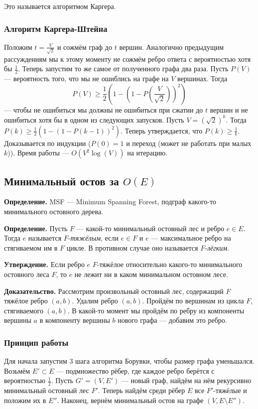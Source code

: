Это называется алгоритмом Каргера.

\subsubsection{Алгоритм Каргера-Штейна}
Положим $t = \frac{V}{\sqrt 2}$ и сожмём граф до $t$ вершин.
Аналогично предыдущим рассуждениям мы к этому моменту не сожмём ребро ответа с вероятностью хотя бы $\frac{1}{2}$.
Теперь запустим то же самое от полученного графа два раза.
Пусть $P(V)$ --- вероятность того, что мы не ошиблись на графе на $V$ вершинах.
Тогда
\[
    P(V) \ge \frac{1}{2} \left(1 - \left(1 - P \left( \frac{V}{\sqrt 2} \right) \right)^2 \right)
\]
--- чтобы не ошибиться мы должны не ошибиться при сжатии до $t$ вершин и не ошибиться хотя бы в одном из следующих запусков.
Пусть $V = (\sqrt 2)^k$.
Тогда $P(k) \ge \frac{1}{2} (1 - (1 - P(k - 1))^2)$.
Теперь утверждается, что $P(k) \ge \frac{1}{k}$.
Доказывается по индукции ($P(0) = 1$ и переход (может не работать при малых $k$)).
Время работы --- $O(V^2 \log(V))$ на итерацию.

\subsection{Минимальный остов за $O(E)$}
\textbf{Определение.} MSF --- Minimum Spanning Forest, подграф какого-то минимального остовного дерева.

\textbf{Определение.} Пусть $F$ --- какой-то минимальный остовный лес и ребро $e \in E$.
Тогда $e$ называется $F$-\textit{тяжёлым}, если $e \in F$ и $e$ --- максимальное ребро на стягиваемом им в $F$ цикле.
В противном случае оно называется $F$-\textit{лёгким}.

\textbf{Утверждение.} Если ребро $e$ $F$-тяжёлое относительно какого-то минимального остовного леса $F$, то $e$ не лежит ни в каком минимальном остовном лесе.

\textbf{Доказательство.} Рассмотрим произвольный остовный лес, содержащий $F$ тяжёлое ребро $(a, b)$.
Удалим ребро $(a, b)$.
Пройдём по вершинам из цикла $F$, стягиваемого $(a, b)$.
В какой-то момент мы пройдём по ребру из компоненты вершины $a$ в компоненту вершины $b$ нового графа --- добавим это ребро.

\subsubsection{Принцип работы}
Для начала запустим 3 шага алгоритма Борувки, чтобы размер графа уменьшался.
Возьмём $E' \subset E$ --- подмножество рёбер, где каждое ребро берётся с вероятностью $\frac{1}{2}$.
Пусть $G' = (V, E')$ --- новый граф, найдём на нём рекурсивно минимальный остовный лес $F'$.
Теперь найдём среди рёбер $E$ все $F'$-тяжёлые и положим их в $E''$.
Наконец, вернём минимальный остов на графе $(V, E \setminus E'')$.

